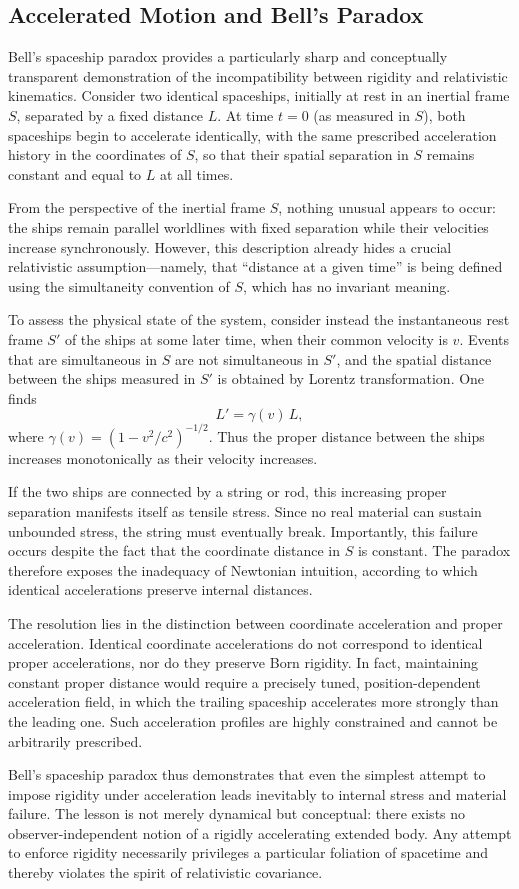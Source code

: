 
\subsection{Accelerated Motion and Bell's Paradox}

Bell's spaceship paradox provides a particularly sharp and conceptually transparent demonstration of the incompatibility between rigidity and relativistic kinematics. Consider two identical spaceships, initially at rest in an inertial frame $S$, separated by a fixed distance $L$. At time $t=0$ (as measured in $S$), both spaceships begin to accelerate identically, with the same prescribed acceleration history in the coordinates of $S$, so that their spatial separation in $S$ remains constant and equal to $L$ at all times.

From the perspective of the inertial frame $S$, nothing unusual appears to occur: the ships remain parallel worldlines with fixed separation while their velocities increase synchronously. However, this description already hides a crucial relativistic assumption—namely, that ``distance at a given time'' is being defined using the simultaneity convention of $S$, which has no invariant meaning.

To assess the physical state of the system, consider instead the instantaneous rest frame $S'$ of the ships at some later time, when their common velocity is $v$. Events that are simultaneous in $S$ are not simultaneous in $S'$, and the spatial distance between the ships measured in $S'$ is obtained by Lorentz transformation. One finds
\begin{equation}
L' = \gamma(v)\,L,
\end{equation}
where $\gamma(v) = (1 - v^2/c^2)^{-1/2}$. Thus the proper distance between the ships increases monotonically as their velocity increases.

If the two ships are connected by a string or rod, this increasing proper separation manifests itself as tensile stress. Since no real material can sustain unbounded stress, the string must eventually break. Importantly, this failure occurs despite the fact that the coordinate distance in $S$ is constant. The paradox therefore exposes the inadequacy of Newtonian intuition, according to which identical accelerations preserve internal distances.

The resolution lies in the distinction between coordinate acceleration and proper acceleration. Identical coordinate accelerations do not correspond to identical proper accelerations, nor do they preserve Born rigidity. In fact, maintaining constant proper distance would require a precisely tuned, position-dependent acceleration field, in which the trailing spaceship accelerates more strongly than the leading one. Such acceleration profiles are highly constrained and cannot be arbitrarily prescribed.

Bell's spaceship paradox thus demonstrates that even the simplest attempt to impose rigidity under acceleration leads inevitably to internal stress and material failure. The lesson is not merely dynamical but conceptual: there exists no observer-independent notion of a rigidly accelerating extended body. Any attempt to enforce rigidity necessarily privileges a particular foliation of spacetime and thereby violates the spirit of relativistic covariance.

